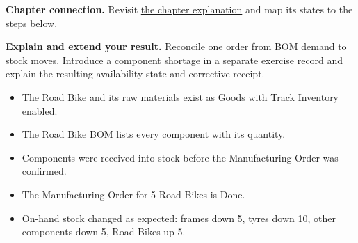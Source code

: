 \textbf{Chapter connection.} Revisit \hyperref[ch:production-planning]{the chapter explanation} and map its states to the steps below.




\begin{verification}
\textbf{Explain and extend your result.} Reconcile one order from BOM demand to stock moves. Introduce a component shortage in a separate exercise record and explain the resulting availability state and corrective receipt.


\begin{itemize}
  \item The Road Bike and its raw materials exist as Goods with Track Inventory enabled.
  \item The Road Bike BOM lists every component with its quantity.
  \item Components were received into stock before the Manufacturing Order was confirmed.
  \item The Manufacturing Order for 5 Road Bikes is Done.
  \item On-hand stock changed as expected: frames down 5, tyres down 10, other components down 5, Road Bikes up 5.
\end{itemize}
\end{verification}
